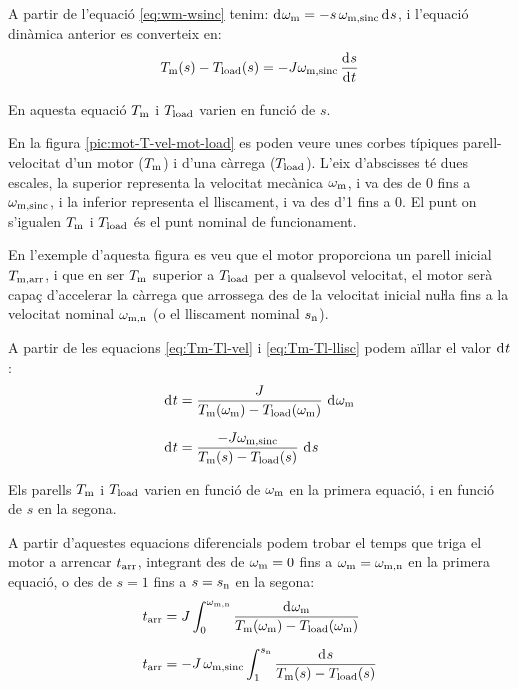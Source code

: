 A partir de l'equació \eqref{eq:wm-wsinc} tenim: $\diff \omega\ped{m} = -s\,\omega\ped{m,sinc} \diff s$, i l'equació dinàmica anterior es converteix en:
\begin{equation}\label{eq:Tm-Tl-llisc}
    T\ped{m}(s) - T\ped{load}(s) = -J \omega\ped{m,sinc}\,\frac{\diff s}{\diff t}
\end{equation}

En aquesta equació $T_\mathrm{m}$ i $T_\mathrm{load}$ varien en funció de $s$.


En la figura \vref{pic:mot-T-vel-mot-load} es poden veure unes corbes típiques parell-velocitat d'un motor ($T_\mathrm{m}$) i d'una  càrrega ($T_\mathrm{load}$). L'eix d'abscisses té dues escales, la superior representa la velocitat mecànica $\omega_\mathrm{m}$, i va des de 0 fins a $\omega_\mathrm{m,sinc}$, i la inferior representa el lliscament, i va des d'1 fins a 0. El punt on s'igualen $T_\mathrm{m}$ i $T_\mathrm{load}$ és el punt nominal de funcionament.

En l'exemple d'aquesta figura es veu que el motor proporciona un parell inicial $T_\mathrm{m,arr}$, i que en ser $T_\mathrm{m}$  superior a $T_\mathrm{load}$ per a qualsevol velocitat, el motor serà  capaç d'accelerar la càrrega que arrossega des de la velocitat inicial nuŀla fins a la velocitat nominal $\omega_\mathrm{m,n}$ (o el lliscament nominal $s_\mathrm{n}$).
\begin{center}
    
    \label{pic:mot-T-vel-mot-load}
\end{center}

A partir de les equacions \eqref{eq:Tm-Tl-vel} i \eqref{eq:Tm-Tl-llisc} podem aïllar el valor $\diff t$:
\begin{subequations}
\begin{align}
    \diff t &= \frac{J}{T\ped{m}(\omega\ped{m})-T\ped{load}(\omega\ped{m})}\,\diff\omega\ped{m}\\[1.5ex]
    \diff t &= \frac{-J \omega\ped{m,sinc}}{T\ped{m}(s)-T\ped{load}(s)}\,\diff s
\end{align}
\end{subequations}

Els parells $T_\mathrm{m}$ i $T_\mathrm{load}$ varien en funció de $\omega_\mathrm{m}$ en la primera equació, i en funció de $s$ en la segona.

A partir d'aquestes equacions diferencials podem trobar el temps que triga el motor a arrencar $t_\mathrm{arr}$, integrant des de $\omega_\mathrm{m}=0$ fins a $\omega_\mathrm{m}=\omega_\mathrm{m,n}$ en la primera equació, o des de $s = 1$ fins a $s = s_\mathrm{n}$ en la segona:
\begin{subequations}
\begin{align}
    t\ped{arr} &= J\int_{0}^{\omega\ped{m,n}} \frac{\diff\omega\ped{m}}{T\ped{m}(\omega\ped{m})-T\ped{load}(\omega\ped{m})}\label{eq:tarr-mot}\\[1.5ex]
    t\ped{arr} &= - J\,\omega\ped{m,sinc} \int_{1}^{s\ped{n}} \frac{\diff s}{T\ped{m}(s)-T\ped{load}(s)}
\end{align}
\end{subequations}

